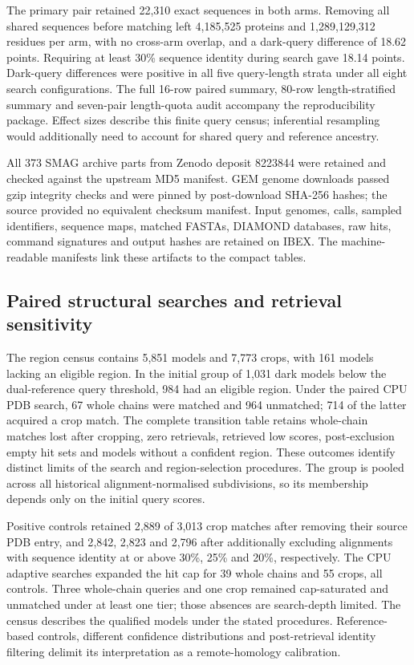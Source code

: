 \documentclass[11pt]{article}
\begin{document}
The primary pair retained 22{,}310 exact sequences in both arms. Removing all shared sequences
before matching left 4{,}185{,}525 proteins and 1{,}289{,}129{,}312 residues per arm, with no
cross-arm overlap, and a dark-query difference of 18.62 points. Requiring at least 30\%
sequence identity during search gave 18.14 points. Dark-query differences were positive in
all five query-length strata under all eight search configurations. The full 16-row paired
summary, 80-row length-stratified summary and seven-pair length-quota audit accompany the
reproducibility package. Effect sizes describe this finite query census; inferential
resampling would additionally need to account for shared query and reference ancestry.

All 373 SMAG archive parts from Zenodo deposit 8223844 were retained and checked against the
upstream MD5 manifest. GEM genome downloads passed gzip integrity checks and were pinned by
post-download SHA-256 hashes; the source provided no equivalent checksum manifest.
Input genomes, calls, sampled identifiers, sequence maps, matched FASTAs, DIAMOND databases,
raw hits, command signatures and output hashes are retained on IBEX. The machine-readable
manifests link these artifacts to the compact tables.


\subsection*{Paired structural searches and retrieval sensitivity}
The region census contains 5{,}851 models and 7{,}773 crops, with 161 models lacking an eligible
region. In the initial group of 1{,}031 dark models below the dual-reference query threshold,
984 had an eligible region. Under the paired CPU PDB search, 67 whole chains were matched and
964 unmatched; 714 of the latter acquired a crop match. The complete transition table retains
whole-chain matches lost after cropping, zero retrievals, retrieved low scores, post-exclusion
empty hit sets and models without a confident region. These outcomes identify distinct
limits of the search and region-selection procedures. The group is pooled across all historical
alignment-normalised subdivisions, so its membership depends only on the initial query scores.

Positive controls retained 2{,}889 of 3{,}013 crop matches after removing their source PDB entry,
and 2{,}842, 2{,}823 and 2{,}796 after additionally excluding alignments with sequence identity
at or above 30\%, 25\% and 20\%, respectively. The CPU adaptive searches expanded the hit cap
for 39 whole chains and 55 crops, all controls. Three whole-chain queries and one crop remained
cap-saturated and unmatched under at least one tier; those absences are search-depth limited.
The census describes the qualified models under the stated procedures. Reference-based
controls, different confidence distributions and post-retrieval identity filtering delimit
its interpretation as a remote-homology calibration.
\end{document}

